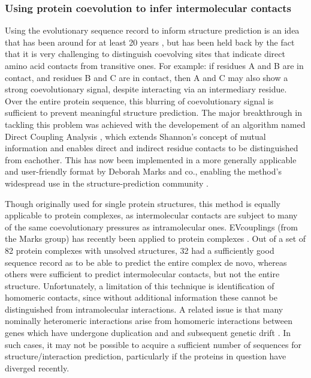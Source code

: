 \documentclass[a4paper,11pt,twoside,openright]{scrbook}
\begin{document}
\subsubsection{Using protein coevolution to infer intermolecular contacts}
Using the evolutionary sequence record to inform structure prediction is an idea that has been around for at least 20 years \cite{Altschuh1987}, but has been held back by the fact that it is very challenging to distinguish coevolving sites that indicate direct amino acid contacts from transitive ones. For example: if residues A and B are in contact, and residues B and C are in contact, then A and C may also show a strong coevolutionary signal, despite interacting via an intermediary residue. Over the entire protein sequence, this blurring of coevolutionary signal is sufficient to prevent meaningful structure prediction. The major breakthrough in tackling this problem was achieved with the developement of an algorithm named Direct Coupling Analysis \cite{Weigt2009,Lunt2010}, which extends Shannon's concept of mutual information \cite{Shannon1948} and enables direct and indirect residue contacts to be distinguished from eachother. This has now been implemented in a more generally applicable and user-friendly format by Deborah Marks and co., enabling the method's widespread use in the structure-prediction community \cite{Marks2011,Marks2012,Hopf2014}.

Though originally used for single protein structures, this method is equally applicable to protein complexes, as intermolecular contacts are subject to many of the same coevolutionary pressures as intramolecular ones. EVcouplings (from the Marks group) has recently been applied to protein complexes \cite{Hopf2014}. Out of a set of 82 protein complexes with unsolved structures, 32 had a sufficiently good sequence record as to be able to predict the entire complex de novo, whereas others were sufficient to predict intermolecular contacts, but not the entire structure. Unfortunately, a limitation of this technique is identification of homomeric contacts, since without additional information these cannot be distinguished  from intramolecular interactions. A related issue is that many nominally heteromeric interactions arise from homomeric interactions between genes which have undergone duplication and and subsequent genetic drift \cite{Wagner2001,Wagner2003,Fokkens2012}. In such cases, it may not be possible to acquire a sufficient number of sequences for structure/interaction prediction, particularly if the proteins in question have diverged recently.
\end{document}
